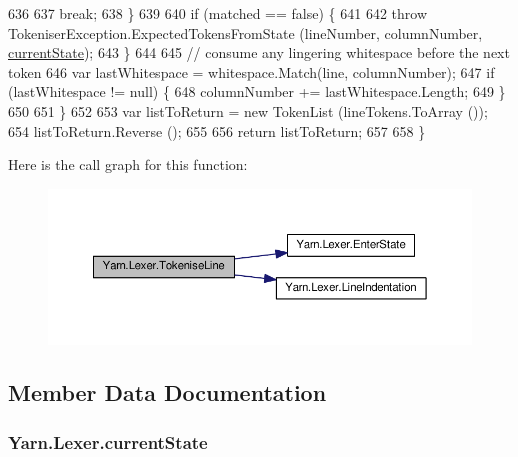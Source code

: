 \begin{DoxyCode}
636 
637                     \textcolor{keywordflow}{break};
638                 \}
639 
640                 \textcolor{keywordflow}{if} (matched == \textcolor{keyword}{false}) \{
641 
642                     \textcolor{keywordflow}{throw} TokeniserException.ExpectedTokensFromState (lineNumber, columnNumber, 
      \hyperlink{a00117_ac90b7dce8103425a148f9e8588f14137}{currentState});
643                 \}
644 
645                 \textcolor{comment}{// consume any lingering whitespace before the next token}
646                 var lastWhitespace = whitespace.Match(line, columnNumber);
647                 \textcolor{keywordflow}{if} (lastWhitespace != null) \{
648                     columnNumber += lastWhitespace.Length;
649                 \}
650 
651             \}
652 
653             var listToReturn = \textcolor{keyword}{new} TokenList (lineTokens.ToArray ());
654             listToReturn.Reverse ();
655 
656             \textcolor{keywordflow}{return} listToReturn;
657 
658         \}
\end{DoxyCode}


Here is the call graph for this function\-:
\nopagebreak
\begin{figure}[H]
\begin{center}
\leavevmode
\includegraphics[width=350pt]{a00117_a20b63f6ef434f6a40fd388f262f03fa8_cgraph}
\end{center}
\end{figure}




\subsection{Member Data Documentation}
\hypertarget{a00117_ac90b7dce8103425a148f9e8588f14137}{
\subsubsection[{current\-State}]{ Yarn.\-Lexer.\-current\-State\hspace{0.3cm}{\ttfamily [private]}}}\label{a00117_ac90b7dce8103425a148f9e8588f14137}


